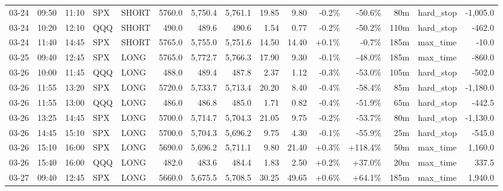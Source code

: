 \documentclass[11pt,a4paper,twoside]{article}
\begin{document}
\begin{landscape}
\begin{center}
\begin{longtable}{>{\color{txtmain}}l l l l l r r r r r r r r >{\color{txtmain}}l r}
03-24 & 09:50 & 11:10 & SPX & SHORT & 5760.0 & 5,750.4 & 5,761.1 & 19.85 & 9.80 & \textcolor{lossred}{-0.2\%} & \textcolor{lossred}{-50.6\%} & 80m & hard\_stop & \textcolor{lossred}{-1,005.0} \\
03-24 & 10:20 & 12:10 & QQQ & SHORT & 490.0 & 489.6 & 490.6 & 1.54 & 0.77 & \textcolor{lossred}{-0.2\%} & \textcolor{lossred}{-50.2\%} & 110m & hard\_stop & \textcolor{lossred}{-462.0} \\
03-24 & 11:40 & 14:45 & SPX & SHORT & 5765.0 & 5,755.0 & 5,751.6 & 14.50 & 14.40 & \textcolor{wingreen}{+0.1\%} & \textcolor{lossred}{-0.7\%} & 185m & max\_time & \textcolor{lossred}{-10.0} \\
03-25 & 09:40 & 12:45 & SPX & LONG & 5765.0 & 5,772.7 & 5,766.3 & 17.90 & 9.30 & \textcolor{lossred}{-0.1\%} & \textcolor{lossred}{-48.0\%} & 185m & max\_time & \textcolor{lossred}{-860.0} \\
03-26 & 10:00 & 11:45 & QQQ & LONG & 488.0 & 489.4 & 487.8 & 2.37 & 1.12 & \textcolor{lossred}{-0.3\%} & \textcolor{lossred}{-53.0\%} & 105m & hard\_stop & \textcolor{lossred}{-502.0} \\
03-26 & 11:55 & 13:20 & SPX & LONG & 5720.0 & 5,733.7 & 5,713.4 & 20.20 & 8.40 & \textcolor{lossred}{-0.4\%} & \textcolor{lossred}{-58.4\%} & 85m & hard\_stop & \textcolor{lossred}{-1,180.0} \\
03-26 & 11:55 & 13:00 & QQQ & LONG & 486.0 & 486.8 & 485.0 & 1.71 & 0.82 & \textcolor{lossred}{-0.4\%} & \textcolor{lossred}{-51.9\%} & 65m & hard\_stop & \textcolor{lossred}{-442.5} \\
03-26 & 13:25 & 14:45 & SPX & LONG & 5700.0 & 5,714.7 & 5,704.3 & 21.05 & 9.75 & \textcolor{lossred}{-0.2\%} & \textcolor{lossred}{-53.7\%} & 80m & hard\_stop & \textcolor{lossred}{-1,130.0} \\
03-26 & 14:45 & 15:10 & SPX & LONG & 5700.0 & 5,704.3 & 5,696.2 & 9.75 & 4.30 & \textcolor{lossred}{-0.1\%} & \textcolor{lossred}{-55.9\%} & 25m & hard\_stop & \textcolor{lossred}{-545.0} \\
03-26 & 15:10 & 16:00 & SPX & LONG & 5690.0 & 5,696.2 & 5,711.1 & 9.80 & 21.40 & \textcolor{wingreen}{+0.3\%} & \textcolor{wingreen}{+118.4\%} & 50m & max\_time & \textcolor{wingreen}{1,160.0} \\
03-26 & 15:40 & 16:00 & QQQ & LONG & 482.0 & 483.6 & 484.4 & 1.83 & 2.50 & \textcolor{wingreen}{+0.2\%} & \textcolor{wingreen}{+37.0\%} & 20m & max\_time & \textcolor{wingreen}{337.5} \\
03-27 & 09:40 & 12:45 & SPX & LONG & 5660.0 & 5,675.5 & 5,708.5 & 30.25 & 49.65 & \textcolor{wingreen}{+0.6\%} & \textcolor{wingreen}{+64.1\%} & 185m & max\_time & \textcolor{wingreen}{1,940.0} \\

\end{longtable}
\end{center}
\end{landscape}
\end{document}

